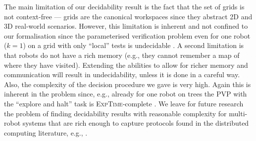 \documentclass{llncs}
\def\exptime{\textsc{ExpTime}}
\begin{document}
The main limitation of our decidability result is the fact that the set of grids is not context-free --- grids are the canonical workspaces since they abstract 2D and 3D real-world scenarios.  However, this limitation is inherent and not confined to our formalisation since the parameterised verification problem even for one robot ($k=1$) on a grid with only ``local'' tests is undecidable \cite{BlHe67,Rubin15AAMAS}. A second limitation is that robots do not have a rich memory (e.g., they cannot remember a map of where they have visited). Extending the abilities to allow for richer memory and communication will result in undecidability, unless it is done in a careful way. Also, the complexity of the decision procedure we gave is very high. Again this is inherent in the problem since, e.g., already for one robot on trees the PVP with the ``explore and halt'' task is \exptime-complete \cite{Rubin15AAMAS}.  We leave for future research the problem of finding decidability results with reasonable complexity for multi-robot systems that are rich enough to capture protocols found in the distributed computing literature, e.g., \cite{BeSl95,KKR06,FPS11,FPS12}.



%
\end{document}
